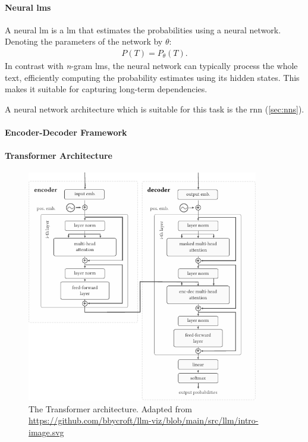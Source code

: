 \paragraph{Neural \acp{lm}} A neural \ac{lm} is a \acl{lm} that estimates the probabilities using a neural network. Denoting the parameters of the network by $\theta$:
\begin{align}
    P(T) = P_\theta(T).
\end{align}
In contrast with \emph{n}-gram \acp{lm}, the neural network can typically process the whole text, efficiently computing the probability estimates using its hidden states. This makes it suitable for capturing long-term dependencies.

A neural network architecture which is suitable for this task is the \ac{rnn} (\autoref{sec:nns}).


\paragraph{Encoder-Decoder Framework}

\paragraph{Transformer Architecture}
\begin{figure}[h]
    \centering
    \includegraphics[width=0.9\textwidth]{img/transformer.pdf}
    \caption{The Transformer architecture. Adapted from \url{https://github.com/bbycroft/llm-viz/blob/main/src/llm/intro-image.svg}}
    \label{fig:transformer}
\end{figure}


